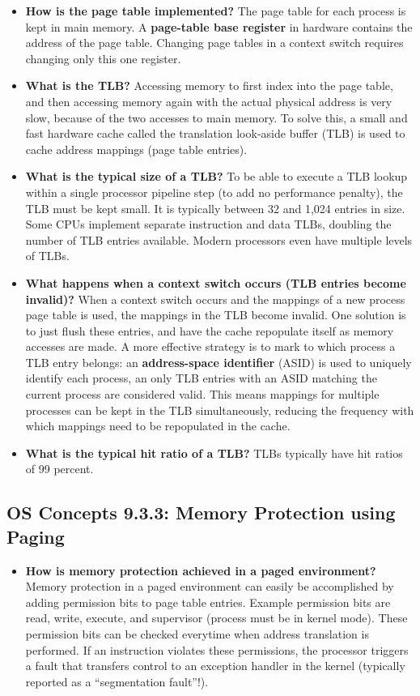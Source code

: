 \documentclass[12pt]{article}
\begin{document}
\begin{itemize}
    \item \textbf{How is the page table implemented?} The page table for each process is kept in main memory. A \textbf{page-table base register} in hardware contains the address of the page table. Changing page tables in a context switch requires changing only this one register.
    \item \textbf{What is the TLB?} Accessing memory to first index into the page table, and then accessing memory again with the actual physical address is very slow, because of the two accesses to main memory. To solve this, a small and fast hardware cache called the translation look-aside buffer (TLB) is used to cache address mappings (page table entries).
    \item \textbf{What is the typical size of a TLB?} To be able to execute a TLB lookup within a single processor pipeline step (to add no performance penalty), the TLB must be kept small. It is typically between 32 and 1,024 entries in size. Some CPUs implement separate instruction and data TLBs, doubling the number of TLB entries available. Modern processors even have multiple levels of TLBs.
    \item \textbf{What happens when a context switch occurs (TLB entries become invalid)?} When a context switch occurs and the mappings of a new process page table is used, the mappings in the TLB become invalid. One solution is to just flush these entries, and have the cache repopulate itself as memory accesses are made. A more effective strategy is to mark to which process a TLB entry belongs: an \textbf{address-space identifier} (ASID) is used to uniquely identify each process, an only TLB entries with an ASID matching the current process are considered valid. This means mappings for multiple processes can be kept in the TLB simultaneously, reducing the frequency with which mappings need to be repopulated in the cache.
    \item \textbf{What is the typical hit ratio of a TLB?} TLBs typically have hit ratios of 99 percent.
\end{itemize}

\subsection*{OS Concepts 9.3.3: Memory Protection using Paging}

\begin{itemize}
    \item \textbf{How is memory protection achieved in a paged environment?} Memory protection in a paged environment can easily be accomplished by adding permission bits to page table entries. Example permission bits are read, write, execute, and supervisor (process must be in kernel mode). These permission bits can be checked everytime when address translation is performed. If an instruction violates these permissions, the processor triggers a fault that transfers control to an exception handler in the kernel (typically reported as a ``segmentation fault''!).
\end{itemize}
\end{document}

